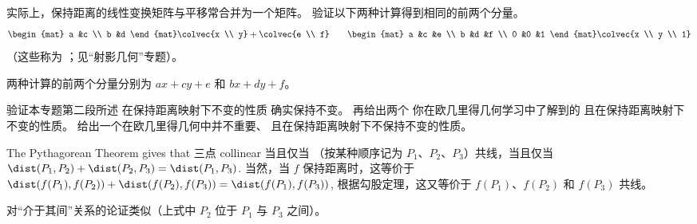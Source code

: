 \begin{exercises}
\begin{answer}
\begin{exparts}
       \end{exparts}
     \end{answer}
  \item \label{exer:HomoCrds}
    实际上，保持距离的线性变换矩阵与平移常合并为一个矩阵。
    验证以下两种计算得到相同的前两个分量。
        \begin{equation*}
           \begin{mat}
             a  &c  \\
             b  &d
           \end{mat}
           \colvec{x  \\ y}
           +\colvec{e \\ f}
           \qquad
           \begin{mat}
             a  &c  &e \\
             b  &d  &f \\
             0  &0  &1
           \end{mat}
           \colvec{x  \\ y \\ 1}
        \end{equation*}
    （这些称为
     ；见“射影几何”专题）。
     \begin{answer}
       两种计算的前两个分量分别为 $ax+cy+e$ 和 $bx+dy+f$。
     \end{answer}
  \item \label{exer:GeomInvDistPre}
    \begin{exparts}
     \partsitem 验证本专题第二段所述
       在保持距离映射下不变的性质
       确实保持不变。
     \partsitem 再给出两个
       你在欧几里得几何学习中了解到的
       且在保持距离映射下不变的性质。
     \partsitem 给出一个在欧几里得几何中并不重要、
       且在保持距离映射下不保持不变的性质。
    \end{exparts}
    \begin{answer}
      \begin{exparts}
        \partsitem The Pythagorean Theorem gives that
          三点
          collinear 当且仅当
          （按某种顺序记为 $P_1$、$P_2$、$P_3$）共线，当且仅当
          $\dist(P_1,P_2)+\dist(P_2,P_3)=\dist(P_1,P_3)$.
          当然，当 $f$ 保持距离时，这等价于
          $\dist(f(P_1),f(P_2))+\dist(f(P_2),f(P_3))=\dist(f(P_1),f(P_3))$,
          根据勾股定理，这又等价于
          $f(P_1)$、$f(P_2)$ 和 $f(P_3)$ 共线。
        
          对“介于其间”关系的论证类似（上式中 $P_2$ 位于
          $P_1$ 与 $P_3$ 之间）。


\end{exparts}
\end{answer}
\end{exercises}

